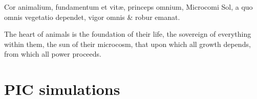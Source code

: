 \begin{savequote}[8cm]
\textlatin{Cor animalium, fundamentum e\longs t vitæ, princeps omnium, Microco\longs mi Sol, a quo omnis vegetatio dependet, vigor omnis \& robur emanat.}

The heart of animals is the foundation of their life, the sovereign of everything within them, the sun of their microcosm, that upon which all growth depends, from which all power proceeds.
\end{savequote}


\chapter{\label{app:1-sims}PIC simulations}

\minitoc

